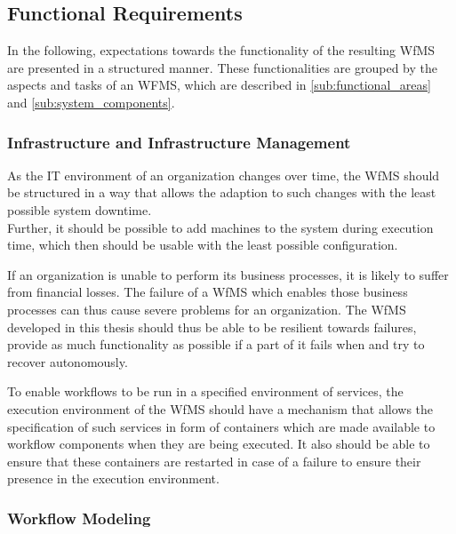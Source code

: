 
\subsection{Functional Requirements} %
  \label{sub:functional_requirements}

  In the following, expectations towards the functionality of the resulting \ac{WfMS} are presented in a structured manner. These functionalities are grouped by the aspects and tasks of an WFMS, which are described in \ref{sub:functional_areas} and \ref{sub:system_components}.

  \subsubsection{Infrastructure and Infrastructure Management} %
    \label{ssub:infrastructure_management}

      As the IT environment of an organization changes over time, %
      the \ac{WfMS} should be structured in a way that allows the adaption to such changes with the least possible system downtime. \\
      Further, it should be possible to add machines to the system during execution time, which then should be usable with the least possible configuration.

      If an organization is unable to perform its business processes, it is likely to suffer from financial losses. The failure of a \ac{WfMS} which enables those business processes can thus cause severe problems for an organization. The \ac{WfMS} developed in this thesis should thus be able to be resilient towards failures, \ie provide as much functionality as possible if a part of it fails when and try to recover autonomously.

      To enable workflows to be run in a specified environment of services, the execution environment of the \ac{WfMS} should have a mechanism that allows the specification of such services in form of containers which are made available to workflow components when they are being executed. It also should be able to ensure that these containers are restarted in case of a failure to ensure their presence in the execution environment.


  \subsubsection{Workflow Modeling} %
    \label{ssub:workflow_modeling}

